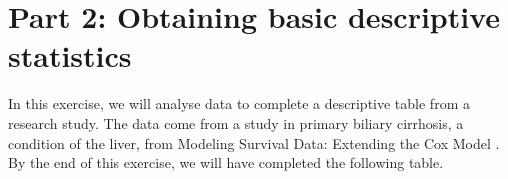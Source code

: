 \documentclass[
]{memoir}
\begin{document}
\hypertarget{part-2-obtaining-basic-descriptive-statistics}{%
\section*{Part 2: Obtaining basic descriptive statistics}\label{part-2-obtaining-basic-descriptive-statistics}}

In this exercise, we will analyse data to complete a descriptive table from a research study. The data come from a study in primary biliary cirrhosis, a condition of the liver, from Modeling Survival Data: Extending the Cox Model \citet{therneau_grambsch10}. By the end of this exercise, we will have completed the following table.

 
  \providecommand{\huxb}[2]{\arrayrulecolor[RGB]{#1}\global\arrayrulewidth=#2pt}
  \providecommand{\huxvb}[2]{\color[RGB]{#1}\vrule width #2pt}
  \providecommand{\huxtpad}[1]{\rule{0pt}{#1}}
  \providecommand{\huxbpad}[1]{\rule[-#1]{0pt}{#1}}
\end{document}
